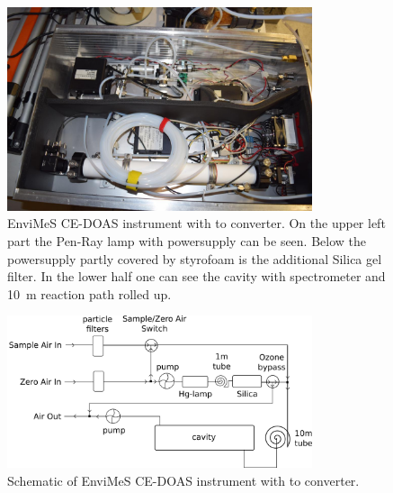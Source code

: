 \begin{figure}[htbp]
  \centering
  \includegraphics[width=0.8\textwidth]{images/envimes_up.jpg}
  \caption{EnviMeS CE-DOAS instrument with  to 
    converter. On the upper left part the Pen-Ray lamp with
    powersupply can be seen. Below the powersupply partly covered by
    styrofoam is the additional Silica gel filter. In the lower half
    one can see the cavity with spectrometer and \SI{10}{\meter}
    reaction path rolled up.}
  \label{fig:envimes}
\end{figure}

\begin{figure}[htbp]
  \centering
  \includegraphics[width=0.8\textwidth]{images/envimes_setup.png}
  \caption{Schematic of EnviMeS CE-DOAS instrument with  to
     converter.}
  \label{fig:envimes-schematic}
\end{figure}

